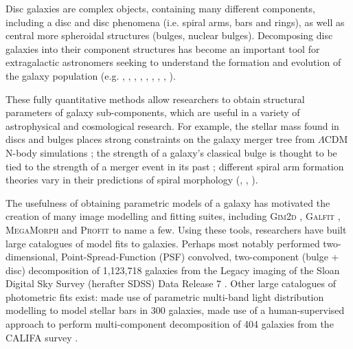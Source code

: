 \documentclass[../main.tex]{subfiles}
\begin{document}
\label{sec:introduction}

Disc galaxies are complex objects, containing many different components, including a disc and disc phenomena (i.e. spiral arms, bars and rings), as well as central more spheroidal structures (bulges, nuclear bulges). Decomposing disc galaxies into their component structures has become an important tool for extragalactic astronomers seeking to understand the formation and evolution of the galaxy population (e.g. \citealt{Simard2002:astro-ph/0205025v2}, \citealt{2011ApJS..196...11S}, \citealt{2012MNRAS.421.2277L}, \citealt{2017MNRAS.469.3363K}, \citealt{megamorph-paper}, \citealt{2011MNRAS.415.3308G}, \citealt{Mendez-Abreu2016:1610.05324v1}, \citealt{Park2006:astro-ph/0611610v2}, \citealt{2015ApJS..219....4S}).

These fully quantitative methods allow researchers to obtain structural parameters of galaxy sub-components, which are useful in a variety of astrophysical and cosmological research. For example, the stellar mass found in discs and bulges places strong constraints on the galaxy merger tree from $\Lambda\mathrm{CDM}$ N-body simulations \citep{Hopkins2010:1004.2708v3}; the strength of a galaxy's classical bulge is thought to be tied to the strength of a merger event in its past \citep{Kormendy2010:1009.3015v1}; different spiral arm formation theories vary in their predictions of spiral morphology (\citealt{Dobbs2014:1407.5062v1}, \citealt{Pour-Imani2016:1608.00969v1}, \citealt{2017MNRAS.472.2263H}).

The usefulness of obtaining parametric models of a galaxy has motivated the creation of many image modelling and fitting suites, including \textsc{Gim2d} \citep{gim2d-paper}, \textsc{Galfit} \citep{galfit-paper}, \textsc{MegaMorph} \citep{megamorph-paper} and \textsc{Profit} \citep{profit-paper} to name a few. Using these tools, researchers have built large catalogues of model fits to galaxies. Perhaps most notably \citet{2011ApJS..196...11S} performed two-dimensional, Point-Spread-Function (PSF) convolved, two-component (bulge + disc) decomposition of 1,123,718 galaxies from the Legacy imaging of the Sloan Digital Sky Survey (herafter SDSS) Data Release 7 \citep{SDSSDR7}. Other large catalogues of photometric fits exist: \cite{2011MNRAS.415.3308G} made use of parametric multi-band light distribution modelling to model stellar bars in 300 galaxies, \cite{Mendez-Abreu2016:1610.05324v1} made use of a human-supervised approach to perform multi-component decomposition of 404 galaxies from the CALIFA survey \citep{Sanchez2011:1111.0962v2}.
\end{document}
